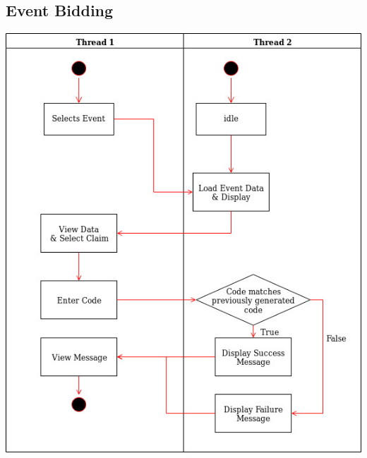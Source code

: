 \documentclass[11pt]{article}
\begin{document}
	\subsection{Event Bidding}
	\includegraphics[scale=0.8]{Bid}
	
	
	
	
\end{document}
